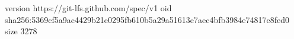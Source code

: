 version https://git-lfs.github.com/spec/v1
oid sha256:5369cf5a9ac4429b21e0295fb610b5a29a51613e7aec4bfb3984e74817e8fed0
size 3278
